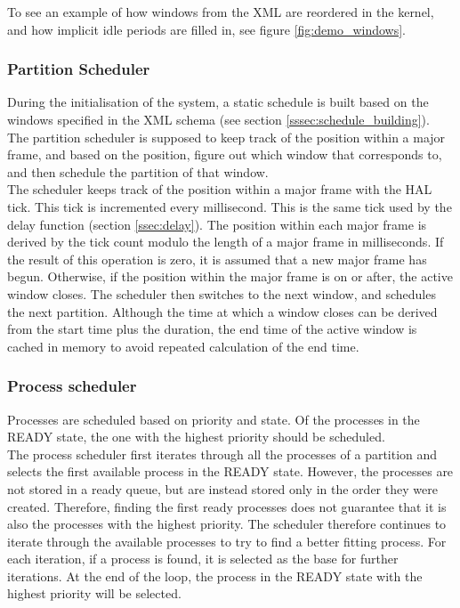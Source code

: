 To see an example of how windows from the XML are reordered in the kernel, and
how implicit idle periods are filled in, see figure \ref{fig:demo_windows}.


\subsubsection{Partition Scheduler}
\label{sssec:impl_partition_scheduler}
During the initialisation of the system, a static schedule is built based on the
windows specified in the XML schema (see section \ref{sssec:schedule_building}).\\

The partition scheduler is supposed to keep track of the position within a major
frame, and based on the position, figure out which window that corresponds to,
and then schedule the partition of that window.\\

The scheduler keeps track of the position within a major frame with the HAL
tick. This tick is incremented every millisecond. This is the same tick used by
the delay function (section \ref{ssec:delay}). The position within each major frame is
derived by the tick count modulo the length of a major frame in
milliseconds. If the result of this operation is zero, it is assumed that a new
major frame has begun. Otherwise, if the position within the major frame is on
or after, the active window closes. The scheduler then switches to the next window,
and schedules the next partition. Although the time at which a window closes
can be derived from the start time plus the duration, the end time of the
active window is cached in memory to avoid repeated calculation of the end time.


\subsubsection{Process scheduler}
Processes are scheduled based on priority and state. Of the processes in the
READY state, the one with the highest priority should be scheduled.\\

The process scheduler first iterates through all the
processes of a partition and selects the first available process in the READY
state. However, the processes are not stored in a ready queue, but are instead
stored only in the order they were created. Therefore, finding the first ready
processes does not guarantee that it is also the processes with the highest
priority. The scheduler therefore continues to iterate through the available
processes to try to find a better fitting process. For
each iteration, if a process is found, it is selected as the
base for further iterations. At the end of the loop, the process in the READY
state with the highest priority will be selected.\\

